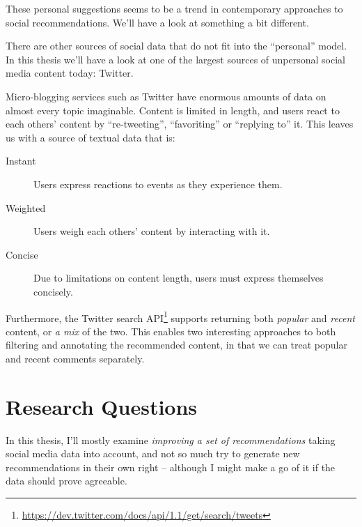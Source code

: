 These personal suggestions seems to be a trend in contemporary approaches to social recommendations.
We'll have a look at something a bit different.


There are other sources of social data that do not fit into the ``personal'' model.
In this thesis we'll have a look at one of the largest sources of unpersonal social media content today: Twitter.

Micro-blogging services such as Twitter have enormous amounts of data on almost every topic imaginable.
Content is limited in length, and users react to each others' content by ``re-tweeting'', ``favoriting'' or ``replying to'' it.
This leaves us with a source of textual data that is:

\begin{description}
  \item[Instant] Users express reactions to events as they experience them.
  \item[Weighted] Users weigh each others' content by interacting with it.
  \item[Concise] Due to limitations on content length, users must express themselves concisely.
\end{description}

Furthermore, the Twitter search API\footnote{\url{https://dev.twitter.com/docs/api/1.1/get/search/tweets}} supports returning both \emph{popular} and \emph{recent} content, or \emph{a mix} of the two.
This enables two interesting approaches to both filtering and annotating the recommended content, in that we can treat popular and recent comments separately.


\section{Research Questions}

In this thesis, I'll mostly examine \emph{improving a set of recommendations} taking social media data into account, and not so much try to generate new recommendations in their own right -- although I might make a go of it if the data should prove agreeable.

